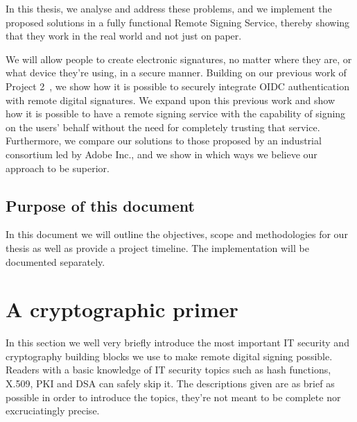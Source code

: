 In this thesis, we analyse and address these problems,
and we implement the proposed solutions in a fully functional Remote Signing Service,
thereby showing that they work in the real world and not just on paper.

We will allow people to create electronic signatures,
no matter where they are, or what device they're using,
in a secure manner.
Building on our previous work of Project 2~\cite{projekt2}, we show how it is possible to securely integrate \gls{OIDC} authentication with remote digital signatures.
We expand upon this previous work and show how it is possible to have a remote signing service with the capability of signing on the users' behalf without the need for completely trusting that service.
Furthermore, we compare our solutions to those proposed by an industrial consortium led by Adobe Inc.,
and we show in which ways we believe our approach to be superior.

\subsection{Purpose of this document}\label{subsec:purpose-of-this-document}

In this document we will outline the objectives, scope and methodologies for our thesis as well as provide a project timeline.
The implementation will be documented separately.

\section{A cryptographic primer}\label{sec:a-cryptographic-primer}
In this section we well very briefly introduce the most important IT security and cryptography building blocks we use to make remote digital signing possible.
Readers with a basic knowledge of IT security topics such as hash functions, X.509, \gls{PKI} and \gls{DSA} can safely skip it.
The descriptions given are as brief as possible in order to introduce the topics, they're not meant to be complete nor excruciatingly precise.

